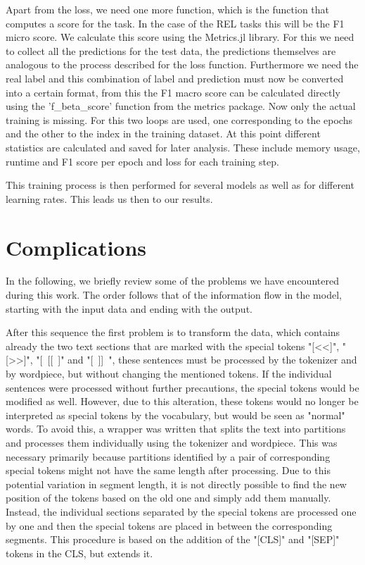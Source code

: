 Apart from the loss, we need one more function, which is the function that computes a score for the task. In the case of the REL tasks this will be the F1 micro score. We calculate this score using the Metrics.jl library. For this we need to collect all the predictions for the test data, the predictions themselves are analogous to the process described for the loss function. Furthermore we need the real label and this combination of label and prediction must now be converted into a certain format, from this the F1 macro score can be calculated directly using the 'f\_beta\_score' function from the metrics package.  
Now only the actual training is missing. For this two loops are used, one corresponding to the epochs and the other to the index in the training dataset. At this point different statistics are calculated and saved for later analysis. These include memory usage, runtime and F1 score per epoch and loss for each training step. 

This training process is then performed for several models as well as for different learning rates. This leads us then to our results. 

\section{Complications}
In the following, we briefly review some of the problems we have encountered during this work. The order follows that of the information flow in the model, starting with the input data and ending with the output. 

After this sequence the first problem is to transform the data, which contains already the two text sections that are marked with the special tokens "[\textless\textless]", "[\textgreater\textgreater]", "[~[[~]" and "[~]]~", these sentences must be processed by the tokenizer and by wordpiece, but without changing the mentioned tokens. If the individual sentences were processed without further precautions, the special tokens would be modified as well. However, due to this alteration, these tokens would no longer be interpreted as special tokens by the vocabulary, but would be seen as "normal" words. To avoid this, a wrapper was written that splits the text into partitions and processes them individually using the tokenizer and wordpiece. This was necessary primarily because partitions identified by a pair of corresponding special tokens might not have the same length after processing. Due to this potential variation in segment length, it is not directly possible to find the new position of the tokens based on the old one and simply add them manually. Instead, the individual sections separated by the special tokens are processed one by one and then the special tokens are placed in between the corresponding segments. This procedure is based on the addition of the "[CLS]" and "[SEP]" tokens in the CLS, but extends it. 

